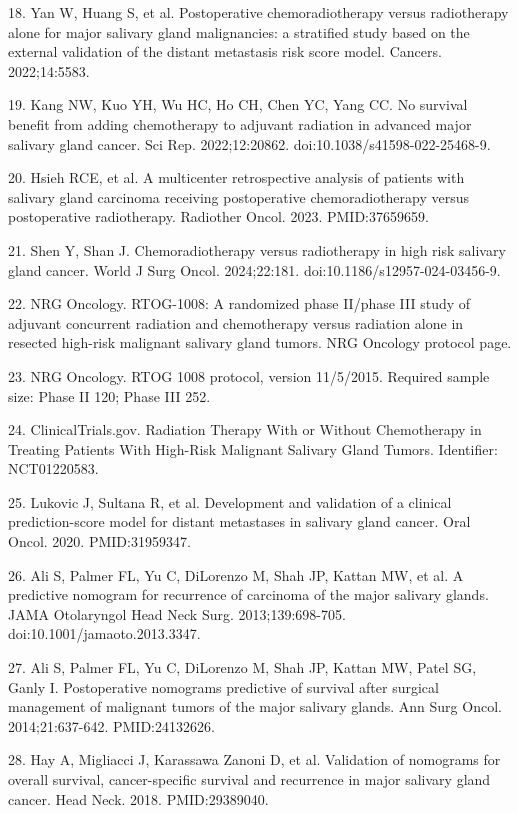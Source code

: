 \documentclass[9pt,twocolumn]{extarticle}
\begin{document}
18. Yan W, Huang S, et al. Postoperative chemoradiotherapy versus radiotherapy alone for major salivary gland malignancies: a stratified study based on the external validation of the distant metastasis risk score model. Cancers. 2022;14:5583.\par
19. Kang NW, Kuo YH, Wu HC, Ho CH, Chen YC, Yang CC. No survival benefit from adding chemotherapy to adjuvant radiation in advanced major salivary gland cancer. Sci Rep. 2022;12:20862. doi:10.1038/s41598-022-25468-9.\par
20. Hsieh RCE, et al. A multicenter retrospective analysis of patients with salivary gland carcinoma receiving postoperative chemoradiotherapy versus postoperative radiotherapy. Radiother Oncol. 2023. PMID:37659659.\par
21. Shen Y, Shan J. Chemoradiotherapy versus radiotherapy in high risk salivary gland cancer. World J Surg Oncol. 2024;22:181. doi:10.1186/s12957-024-03456-9.\par
22. NRG Oncology. RTOG-1008: A randomized phase II/phase III study of adjuvant concurrent radiation and chemotherapy versus radiation alone in resected high-risk malignant salivary gland tumors. NRG Oncology protocol page.\par
23. NRG Oncology. RTOG 1008 protocol, version 11/5/2015. Required sample size: Phase II 120; Phase III 252.\par
24. ClinicalTrials.gov. Radiation Therapy With or Without Chemotherapy in Treating Patients With High-Risk Malignant Salivary Gland Tumors. Identifier: NCT01220583.\par
25. Lukovic J, Sultana R, et al. Development and validation of a clinical prediction-score model for distant metastases in salivary gland cancer. Oral Oncol. 2020. PMID:31959347.\par
26. Ali S, Palmer FL, Yu C, DiLorenzo M, Shah JP, Kattan MW, et al. A predictive nomogram for recurrence of carcinoma of the major salivary glands. JAMA Otolaryngol Head Neck Surg. 2013;139:698-705. doi:10.1001/jamaoto.2013.3347.\par
27. Ali S, Palmer FL, Yu C, DiLorenzo M, Shah JP, Kattan MW, Patel SG, Ganly I. Postoperative nomograms predictive of survival after surgical management of malignant tumors of the major salivary glands. Ann Surg Oncol. 2014;21:637-642. PMID:24132626.\par
28. Hay A, Migliacci J, Karassawa Zanoni D, et al. Validation of nomograms for overall survival, cancer-specific survival and recurrence in major salivary gland cancer. Head Neck. 2018. PMID:29389040.\par
\end{document}
